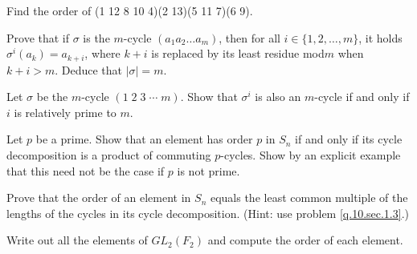 \documentclass[
    11pt,a4paper,
]{exam}
\begin{document}
\begin{questions}
    
    
    
    
    
    \question
    Find the order of (1 12 8 10 4)(2 13)(5 11 7)(6 9).
    
    
    
    
    
    \question\label{q.10.sec.1.3}
    Prove that if \(\sigma\) is the \(m\)-cycle \(\left(a_1 a_2 \ldots a_m\right)\), then for all \(i \in\{1,2, \ldots, m\}\), it holds \(\sigma^i\left(a_k\right)=a_{k+i}\), where \(k+i\) is replaced by its least residue mod\;\(m\) when \(k+i>m\). Deduce that \(|\sigma|=m\).
    
    \question
    Let \(\sigma\) be the \(m\)-cycle \((1\; 2\; 3\; \cdots\; m)\). Show that \(\sigma^i\) is also an \(m\)-cycle if and only if \(i\) is relatively prime to \(m\).
    
    
    \question
    Let \(p\) be a prime. Show that an element has order \(p\) in \(S_n\) if and only if its cycle decomposition is a product of commuting \(p\)-cycles. Show by an explicit example that this need not be the case if \(p\) is not prime.
    
    \question
    Prove that the order of an element in \(S_n\) equals the least common multiple of the lengths of the cycles in its cycle decomposition. (Hint: use problem \ref{q.10.sec.1.3}.)
    
    
    
    
    
    
    \question
    Write out all the elements of \(G L_2\left(F_2\right)\) and compute the order of each element.
    

\end{questions}
\end{document}
